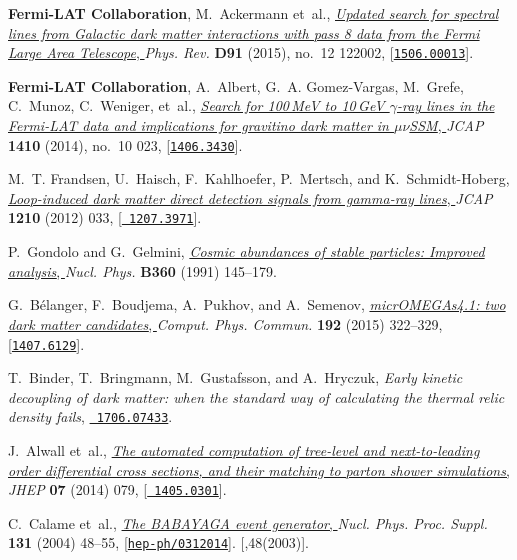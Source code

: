 \documentclass[11pt,a4paper]{article}
\begin{document}
\begin{thebibliography}{10}
{\bf Fermi-LAT Collaboration}, M.~Ackermann et~al.,
  \href{http://dx.doi.org/10.1103/PhysRevD.91.122002}{{\it {Updated search for
  spectral lines from Galactic dark matter interactions with pass 8 data from
  the Fermi Large Area Telescope}}, } {\em Phys. Rev.} {\bf D91} (2015), no.~12
  122002, [\href{http://arxiv.org/abs/1506.00013}{{\tt 1506.00013}}].

{\bf Fermi-LAT Collaboration}, A.~Albert, G.~A. Gomez-Vargas, M.~Grefe,
  C.~Munoz, C.~Weniger, et~al.,
  \href{http://dx.doi.org/10.1088/1475-7516/2014/10/023}{{\it {Search for
  100\,MeV to 10\,GeV $\gamma$-ray lines in the Fermi-LAT data and implications
  for gravitino dark matter in $\mu\nu$SSM}}, } {\em JCAP} {\bf 1410} (2014),
  no.~10 023, [\href{http://arxiv.org/abs/1406.3430}{{\tt 1406.3430}}].

M.~T. Frandsen, U.~Haisch, F.~Kahlhoefer, P.~Mertsch, and K.~Schmidt-Hoberg,
  \href{http://dx.doi.org/10.1088/1475-7516/2012/10/033}{{\it {Loop-induced
  dark matter direct detection signals from gamma-ray lines}}, } {\em JCAP}
  {\bf 1210} (2012) 033, [\href{http://arxiv.org/abs/1207.3971}{{\tt
  1207.3971}}].

P.~Gondolo and G.~Gelmini,
  \href{http://dx.doi.org/10.1016/0550-3213(91)90438-4}{{\it {Cosmic abundances
  of stable particles: Improved analysis}}, } {\em Nucl. Phys.} {\bf B360}
  (1991) 145--179.

G.~B\'elanger, F.~Boudjema, A.~Pukhov, and A.~Semenov,
  \href{http://dx.doi.org/10.1016/j.cpc.2015.03.003}{{\it {micrOMEGAs4.1: two
  dark matter candidates}}, } {\em Comput. Phys. Commun.} {\bf 192} (2015)
  322--329, [\href{http://arxiv.org/abs/1407.6129}{{\tt 1407.6129}}].

T.~Binder, T.~Bringmann, M.~Gustafsson, and A.~Hryczuk, {\it {Early kinetic
  decoupling of dark matter: when the standard way of calculating the thermal
  relic density fails}},  \href{http://arxiv.org/abs/1706.07433}{{\tt
  1706.07433}}.

J.~Alwall et~al., \href{http://dx.doi.org/10.1007/JHEP07(2014)079}{{\it {The
  automated computation of tree-level and next-to-leading order differential
  cross sections, and their matching to parton shower simulations}}, } {\em
  JHEP} {\bf 07} (2014) 079, [\href{http://arxiv.org/abs/1405.0301}{{\tt
  1405.0301}}].

C.~Calame et~al.,
  \href{http://dx.doi.org/10.1016/j.nuclphysbps.2004.02.008}{{\it {The BABAYAGA
  event generator}}, } {\em Nucl. Phys. Proc. Suppl.} {\bf 131} (2004) 48--55,
  [\href{http://arxiv.org/abs/hep-ph/0312014}{{\tt hep-ph/0312014}}].
  [,48(2003)].


\end{thebibliography}
\end{document}
